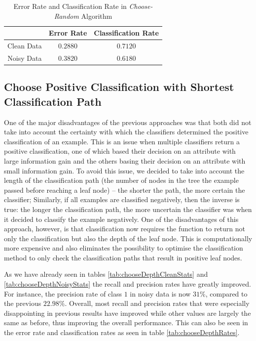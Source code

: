 \documentclass[10pt,a4paper]{article}
\begin{document}
\begin{table}[!ht]
\centering
\begin{tabular}{|c|c|c|}
\hline 
 & \textbf{Error Rate} & \textbf{Classification Rate} \\ 
\hline 
Clean Data & $0.2880$ & $0.7120$ \\ 
\hline 
Noisy Data & $0.3820$ & $0.6180$ \\ 
\hline 
\end{tabular} 
\caption{Error Rate and Classification Rate in \emph{Choose-Random} Algorithm}
\label{tab:chooseRandomRates}
\end{table}

\subsection{Choose Positive Classification with Shortest Classification Path}
One of the major disadvantages of the previous approaches was that both did not take into account the certainty with which the classifiers determined the positive classification of an example. This is an issue when multiple classifiers return a positive classification, one of which based their decision on an attribute with large information gain and the others basing their decision on an attribute with small information gain. To avoid this issue, we decided to take into account the length of the classification path (the number of nodes in the tree the example passed before reaching a leaf node) -- the shorter the path, the more certain the classifier; Similarly, if all examples are classified negatively, then the inverse is true: the longer the classification path, the more uncertain the classifier was when it decided to classify the example negatively. One of the disadvantages of this approach, however, is that classification now requires the function to return not only the classification but also the depth of the leaf node. This is computationally more expensive and also eliminates the possibility to optimise the classification method to only check the classification paths that result in positive leaf nodes. 

As we have already seen in tables \ref{tab:chooseDepthCleanStats} and \ref{tab:chooseDepthNoisyStats} the recall and precision rates have greatly improved. For instance, the precision rate of class $1$ in noisy data is now $31\%$, compared to the previous $22.98\%$. Overall, most recall and precision rates that were especially disappointing in previous results have improved while other values are largely the same as before, thus improving the overall performance. This can also be seen in the error rate and classification rates as seen in table \ref{tab:chooseDepthRates}.
\end{document}
